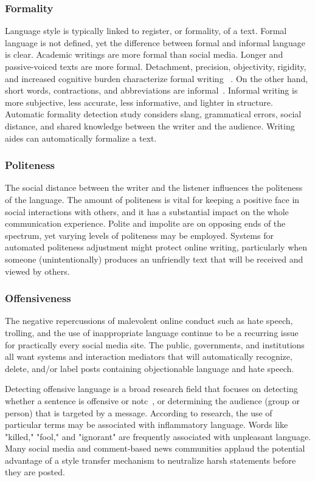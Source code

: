 \documentclass[akbc,twoside,11pt]{article}
\begin{document}
\subsubsection{Formality}

Language style is typically linked to register, or formality, of a text. Formal language is not defined, yet the difference between formal and informal language is clear. Academic writings are more formal than social media. Longer and passive-voiced texts are more formal. Detachment, precision, objectivity, rigidity, and increased cognitive burden characterize formal writing~\cite{sheikha2010automatic} . On the other hand, short words, contractions, and abbreviations are informal~\cite{sheikha2010automatic}. Informal writing is more subjective, less accurate, less informative, and lighter in structure. Automatic formality detection study considers slang, grammatical errors, social distance, and shared knowledge between the writer and the audience. Writing aides can automatically formalize a text.

\subsubsection{Politeness}

The social distance between the writer and the listener influences the politeness of the language. The amount of politeness is vital for keeping a positive face in social interactions with others, and it has a substantial impact on the whole communication experience. Polite and impolite are on opposing ends of the spectrum, yet varying levels of politeness may be employed. Systems for automated politeness adjustment might protect online writing, particularly when someone (unintentionally) produces an unfriendly text that will be received and viewed by others.

\subsubsection{Offensiveness}

The negative repercussions of malevolent online conduct such as hate speech, trolling, and the use of inappropriate language continue to be a recurring issue for practically every social media site. The public, governments, and institutions all want systems and interaction mediators that will automatically recognize, delete, and/or label posts containing objectionable language and hate speech. 

Detecting offensive language is a broad research field that focuses on detecting whether a sentence is offensive or notc~\cite{pavlopoulos2019convai}, or determining the audience (group or person) that is targeted by a message. According to research, the use of particular terms may be associated with inflammatory language. Words like "killed," "fool," and "ignorant" are frequently associated with unpleasant language. Many social media and comment-based news communities applaud the potential advantage of a style transfer mechanism to neutralize harsh statements before they are posted.
\end{document}
